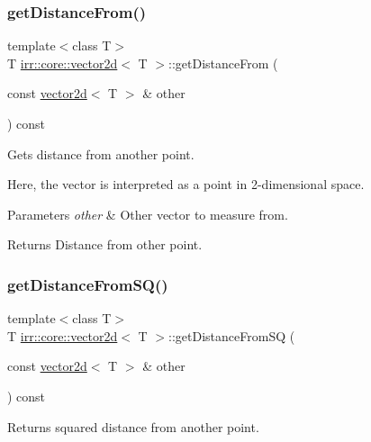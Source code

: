 \subsubsection{\texorpdfstring{get\+Distance\+From()}{getDistanceFrom()}}
{\footnotesize\ttfamily template$<$class T$>$ \\
T \hyperlink{classirr_1_1core_1_1vector2d}{irr\+::core\+::vector2d}$<$ T $>$\+::get\+Distance\+From (\begin{DoxyParamCaption}\item[{const \hyperlink{classirr_1_1core_1_1vector2d}{vector2d}$<$ T $>$ \&}]{other }\end{DoxyParamCaption}) const\hspace{0.3cm}{\ttfamily [inline]}}



Gets distance from another point. 

Here, the vector is interpreted as a point in 2-\/dimensional space. 
\begin{DoxyParams}{Parameters}
{\em other} & Other vector to measure from. \\
\hline
\end{DoxyParams}
\begin{DoxyReturn}{Returns}
Distance from other point. 
\end{DoxyReturn}
\mbox{\label{classirr_1_1core_1_1vector2d_aaf9107f38ae6a7e9bee6580440b53539}} 
\subsubsection{\texorpdfstring{get\+Distance\+From\+S\+Q()}{getDistanceFromSQ()}}
{\footnotesize\ttfamily template$<$class T$>$ \\
T \hyperlink{classirr_1_1core_1_1vector2d}{irr\+::core\+::vector2d}$<$ T $>$\+::get\+Distance\+From\+SQ (\begin{DoxyParamCaption}\item[{const \hyperlink{classirr_1_1core_1_1vector2d}{vector2d}$<$ T $>$ \&}]{other }\end{DoxyParamCaption}) const\hspace{0.3cm}{\ttfamily [inline]}}



Returns squared distance from another point. 

